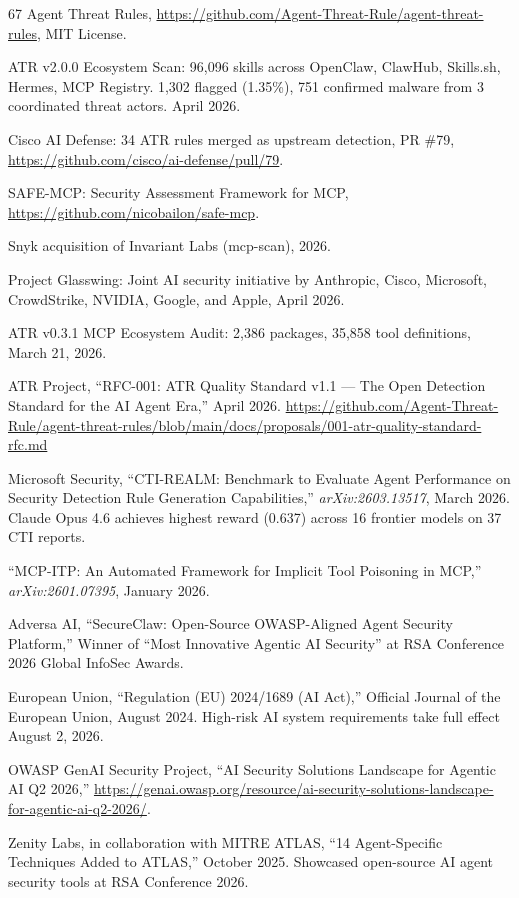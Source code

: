 \documentclass[11pt,letterpaper]{article}
\begin{document}
\begin{thebibliography}{67}
Agent Threat Rules, \url{https://github.com/Agent-Threat-Rule/agent-threat-rules}, MIT License.

ATR v2.0.0 Ecosystem Scan: 96,096 skills across OpenClaw, ClawHub, Skills.sh, Hermes, MCP Registry. 1,302 flagged (1.35\%), 751 confirmed malware from 3 coordinated threat actors. April 2026.

Cisco AI Defense: 34 ATR rules merged as upstream detection, PR \#79, \url{https://github.com/cisco/ai-defense/pull/79}.

SAFE-MCP: Security Assessment Framework for MCP, \url{https://github.com/nicobailon/safe-mcp}.

Snyk acquisition of Invariant Labs (mcp-scan), 2026.

Project Glasswing: Joint AI security initiative by Anthropic, Cisco, Microsoft, CrowdStrike, NVIDIA, Google, and Apple, April 2026.

ATR v0.3.1 MCP Ecosystem Audit: 2,386 packages, 35,858 tool definitions, March 21, 2026.

ATR Project, ``RFC-001: ATR Quality Standard v1.1 --- The Open Detection Standard for the AI Agent Era,'' April 2026. \url{https://github.com/Agent-Threat-Rule/agent-threat-rules/blob/main/docs/proposals/001-atr-quality-standard-rfc.md}

Microsoft Security, ``CTI-REALM: Benchmark to Evaluate Agent Performance on Security Detection Rule Generation Capabilities,'' \textit{arXiv:2603.13517}, March 2026. Claude Opus 4.6 achieves highest reward (0.637) across 16 frontier models on 37 CTI reports.

``MCP-ITP: An Automated Framework for Implicit Tool Poisoning in MCP,'' \textit{arXiv:2601.07395}, January 2026.

Adversa AI, ``SecureClaw: Open-Source OWASP-Aligned Agent Security Platform,'' Winner of ``Most Innovative Agentic AI Security'' at RSA Conference 2026 Global InfoSec Awards.

European Union, ``Regulation (EU) 2024/1689 (AI Act),'' Official Journal of the European Union, August 2024. High-risk AI system requirements take full effect August 2, 2026.

OWASP GenAI Security Project, ``AI Security Solutions Landscape for Agentic AI Q2 2026,'' \url{https://genai.owasp.org/resource/ai-security-solutions-landscape-for-agentic-ai-q2-2026/}.

Zenity Labs, in collaboration with MITRE ATLAS, ``14 Agent-Specific Techniques Added to ATLAS,'' October 2025. Showcased open-source AI agent security tools at RSA Conference 2026.

\end{thebibliography}
\end{document}
